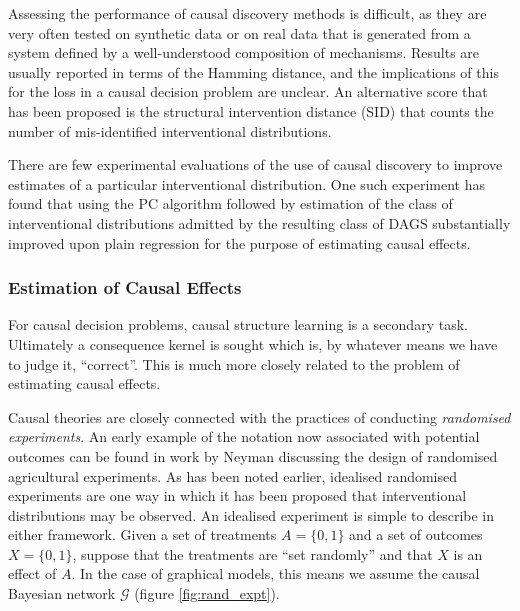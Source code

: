 
Assessing the performance of causal discovery methods is difficult, as they are very often tested on synthetic data or on real data that is generated from a system defined by a well-understood composition of mechanisms\cite{spirtes_causation_1993,ramsey_adjacency-faithfulness_2012,peters_structural_2013,chickering_learning_2002}. Results are usually reported in terms of the Hamming distance, and the implications of this for the loss in a causal decision problem are unclear. An alternative score that has been proposed is the structural intervention distance (SID) that counts the number of mis-identified interventional distributions\cite{peters_structural_2013}.

There are few experimental evaluations of the use of causal discovery to improve estimates of a particular interventional distribution. One such experiment has found that using the PC algorithm followed by estimation of the class of interventional distributions admitted by the resulting class of DAGS substantially improved upon plain regression for the purpose of estimating causal effects\cite{maathuis_predicting_2010}.

\subsubsection{Estimation of Causal Effects}

For causal decision problems, causal structure learning is a secondary task. Ultimately a consequence kernel is sought which is, by whatever means we have to judge it, ``correct''. This is much more closely related to the problem of estimating causal effects.


Causal theories are closely connected with the practices of conducting \emph{randomised experiments}. An early example of the notation now associated with potential outcomes can be found in work by Neyman discussing the design of randomised agricultural experiments\cite{splawa-neyman_application_1990}. As has been noted earlier, idealised randomised experiments are one way in which it has been proposed that interventional distributions may be observed\cite{pearl_causality:_2009}. An idealised experiment is simple to describe in either framework. Given a set of treatments $A=\{0,1\}$ and a set of outcomes $X=\{0,1\}$, suppose that the treatments are ``set randomly'' and that $X$ is an effect of $A$. In the case of graphical models, this means we assume the causal Bayesian network $\mathcal{G}$ (figure \ref{fig:rand_expt}).

